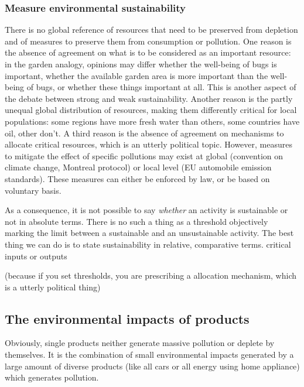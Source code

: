 \documentclass{article}
\begin{document}
\subsubsection{Measure environmental sustainability}
\label{sec:localvsglobal}
There is no global reference of resources that need to be preserved from depletion and of measures to preserve them from consumption or pollution. One reason is the absence of agreement on what is to be considered as an important resource: in the garden analogy, opinions may differ whether the well-being of bugs is important, whether the available garden area is more important than the well-being of bugs, or whether these things important at all. This is another aspect of the debate between strong and weak sustainability. Another reason is the partly unequal global distribution of resources, making them differently critical for local populations: some regions have more fresh water than others, some countries have oil, other don't. A third reason is the absence of agreement on mechanisms to allocate critical resources, which is an utterly political topic. However, measures to mitigate the effect of specific pollutions may exist at global (convention on climate change, Montreal protocol) or local level (EU automobile emission standards). These measures can either be enforced by law, or be based on voluntary basis.

As a consequence, it is not possible to say \emph{whether} an activity is sustainable or not in absolute terms. There is no such a thing as a threshold objectively marking the limit between a sustainable and an unsustainable activity. The best thing we can do is to state sustainability in relative, comparative terms. critical inputs or outputs

(because if you set thresholds, you are prescribing a allocation mechanism, which is a utterly political thing)


\subsection{The environmental impacts of products}
\label{sec:tbd}
Obviously, single products neither generate massive pollution or deplete by themselves. It is the combination of small environmental impacts generated by a large amount of diverse products (like all cars or all energy using home appliance) which generates pollution.
\end{document}

